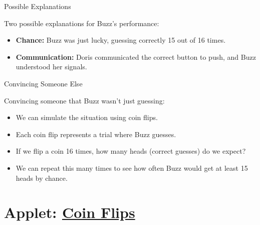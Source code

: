 \documentclass[slidestop,compress,mathserif]{beamer}
\begin{document}
\begin{frame}{Possible Explanations}
    \begin{block}{Two possible explanations for Buzz's performance:}
        \begin{itemize}
            \item \textbf{Chance:} Buzz was just lucky, guessing correctly 15 out of 16 times.
            \item \textbf{Communication:} Doris communicated the correct button to push, and Buzz understood her signals.
        \end{itemize}
    \end{block}
\end{frame}

\begin{frame}{Convincing Someone Else}
    \begin{block}{Convincing someone that Buzz wasn't just guessing:}
        \begin{itemize}
            \item We can simulate the situation using coin flips.
            \item Each coin flip represents a trial where Buzz guesses.
            \item If we flip a coin 16 times, how many heads (correct guesses) do we expect?
            \item We can repeat this many times to see how often Buzz would get at least 15 heads by chance.
        \end{itemize}
    \end{block}
\end{frame}

\section{Applet: \href{https://www.isi-stats.com/isi2nd/ISIapplets2021.html}{Coin Flips}}
\end{document}
